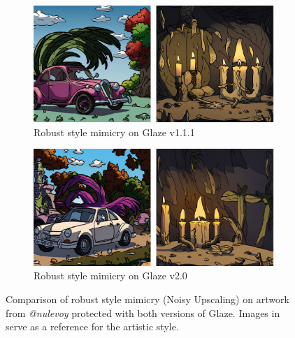 \documentclass{article}
\begin{document}
\begin{figure}[h]
    \centering
    \begin{subfigure}[b]{0.49\textwidth}
         \centering
         \includegraphics[width=\textwidth]{plots/Glaze11RobustGen.pdf}
         \caption{Robust style mimicry on Glaze v1.1.1}
     \end{subfigure}
     \hfill
     \begin{subfigure}[b]{0.49\textwidth}
         \centering
         \includegraphics[width=\textwidth]{plots/Glaze20RobustGen.pdf}
         \caption{Robust style mimicry on Glaze v2.0}
     \end{subfigure}
    \caption{Comparison of robust style mimicry (Noisy Upscaling) on artwork from \emph{@nulevoy} protected with both versions of Glaze. Images in  serve as a reference for the artistic style.}
    \label{fig:glaze20mimicry}
\end{figure}
\end{document}
